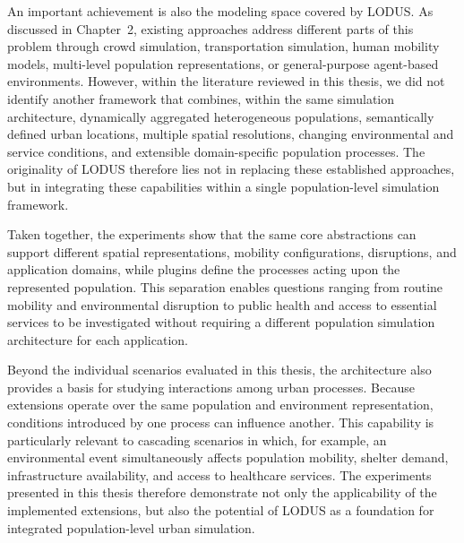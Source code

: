 An important achievement is also the modeling space covered by LODUS. As discussed
in Chapter~2, existing approaches address different parts of this problem through
crowd simulation, transportation simulation, human mobility models, multi-level
population representations, or general-purpose agent-based environments. However,
within the literature reviewed in this thesis, we did not identify another framework
that combines, within the same simulation architecture, dynamically aggregated
heterogeneous populations, semantically defined urban locations, multiple spatial
resolutions, changing environmental and service conditions, and extensible
domain-specific population processes. The originality of LODUS therefore lies not
in replacing these established approaches, but in integrating these capabilities
within a single population-level simulation framework.

Taken together, the experiments show that the same core abstractions can support
different spatial representations, mobility configurations, disruptions, and
application domains, while plugins define the processes acting upon the represented
population. This separation enables questions ranging from routine mobility and
environmental disruption to public health and access to essential services to be
investigated without requiring a different population simulation architecture for
each application.

Beyond the individual scenarios evaluated in this thesis, the architecture also
provides a basis for studying interactions among urban processes. Because extensions
operate over the same population and environment representation, conditions
introduced by one process can influence another. This capability is particularly
relevant to cascading scenarios in which, for example, an environmental event
simultaneously affects population mobility, shelter demand, infrastructure
availability, and access to healthcare services. The experiments presented in this
thesis therefore demonstrate not only the applicability of the implemented
extensions, but also the potential of LODUS as a foundation for integrated
population-level urban simulation.


